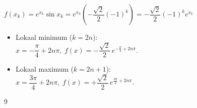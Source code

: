 \documentclass[a4paper]{article}
\begin{document}
$f(x_k)=e^{x_k}\sin x_k
=e^{x_k}\left(-\dfrac{\sqrt{2}}{2}(-1)^k\right)
=-\dfrac{\sqrt{2}}{2}(-1)^k e^{x_k}$ \\

\begin{itemize}
\item Lokaal minimum ($k=2n$): \\

  $x=-\dfrac{\pi}{4}+2n\pi,\;f(x)=-\dfrac{\sqrt{2}}{2}\,e^{-\tfrac{\pi}{4}+2n\pi}$. \\

\item Lokaal maximum ($k=2n+1$): \\

  $x=\dfrac{3\pi}{4}+2n\pi,\;f(x)=+\dfrac{\sqrt{2}}{2}\,e^{\tfrac{3\pi}{4}+2n\pi}$. \\

\end{itemize}

\begin{thebibliography}{9}
\end{thebibliography}
\end{document}

